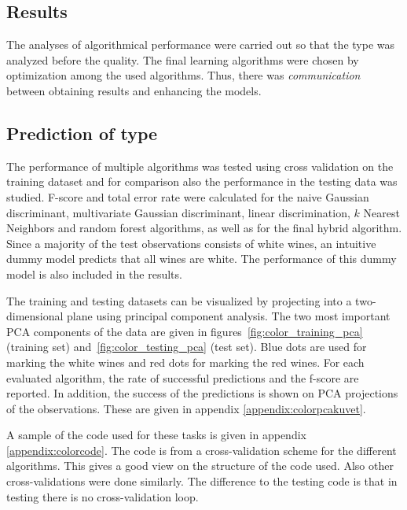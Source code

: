 \documentclass[twoside]{article}
\begin{document}
\begin{multicols}{2}

\section{Results}

The analyses of algorithmical performance were carried out so that the type was analyzed before the quality. The final learning algorithms
were chosen by optimization among the used algorithms. Thus, there was \emph{communication} between obtaining results and enhancing the models.

\subsection{Prediction of type}

The performance of multiple algorithms was tested using cross validation on the training dataset and for comparison also the performance in the testing data was studied.
F-score and total error rate were calculated for the naive Gaussian discriminant, multivariate Gaussian discriminant, linear discrimination, $k$ Nearest Neighbors and random forest
algorithms, as well as for the final hybrid algorithm.
Since a majority of the test observations consists of white wines, an intuitive dummy model predicts that all wines are white. The performance of this dummy model
is also included in the results.

The training and testing datasets can be visualized by projecting into a two-dimensional plane using principal component analysis. The two most important
PCA components of the data are given in figures~\ref{fig:color_training_pca} (training set) and~\ref{fig:color_testing_pca} (test set). 
Blue dots are used for marking the white wines and red dots for marking the red wines.
For each evaluated algorithm, the rate of successful predictions and the f-score are reported. In addition, the success of the predictions is shown on PCA projections
of the observations. These are given in appendix \ref{appendix:colorpcakuvet}.

A sample of the code used for these tasks is given in appendix \ref{appendix:colorcode}. The code is from a cross-validation scheme for the different
algorithms. This gives a good view on the structure of the code used. Also other cross-validations were done similarly. The difference to the testing code is
that in testing there is no cross-validation loop.


\end{multicols}
\end{document}
